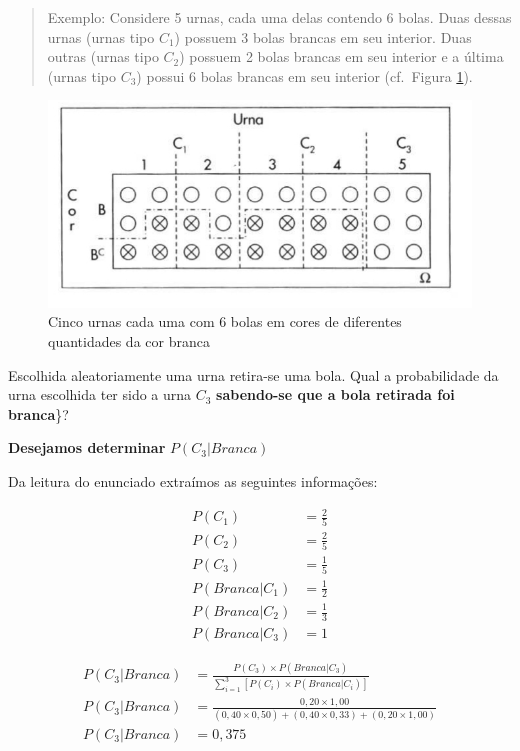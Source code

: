 \documentclass[
]{book}
\begin{document}
\begin{quote}
Exemplo: Considere 5 urnas, cada uma delas contendo 6 bolas. Duas dessas urnas (urnas tipo \(C_{1}\)) possuem 3 bolas brancas em seu interior. Duas outras (urnas tipo \(C_{2}\)) possuem 2 bolas brancas em seu interior e a última (urnas tipo \(C_{3}\)) possui 6 bolas brancas em seu interior (cf.~Figura \ref{fig:fig11}).
\end{quote}

\hfill\break

\begin{figure}

{\centering \includegraphics[width=0.5\linewidth]{images4/exemplo_02_bayes} 

}

\caption{Cinco urnas cada uma com 6 bolas em cores de diferentes quantidades da cor branca}\label{fig:fig11}
\end{figure}

\hfill\break

Escolhida aleatoriamente uma urna retira-se uma bola. Qual a probabilidade da urna escolhida ter sido a urna \(C_{3}\) \textbf{sabendo-se que a bola retirada foi branca}\}?

\hfill\break

\textbf{Desejamos determinar} \(P(C_{3} | Branca)\)

\hfill\break

Da leitura do enunciado extraímos as seguintes informações:

\hfill\break

\begin{align*}
P(C_{1}) & = \frac{2}{5} \\
P(C_{2}) & = \frac{2}{5} \\
P(C_{3}) & = \frac{1}{5} \\
P(Branca | C_{1}) & = \frac{1}{2} \\
P(Branca | C_{2}) & = \frac{1}{3} \\
P(Branca | C_{3}) & = 1
\end{align*}

\hfill\break

\begin{align*}
P(C_{3} | Branca) & = \frac{ P(C_{3}) \times P(Branca | C_{3})  }{  \sum _{i=1}^{3}\left[P\left({C}_{i}\right)\times P\left(Branca | {C}_{i}\right)\right]  } \\
P(C_{3} | Branca) & = \frac{ 0,20 \times 1,00} { (0,40  \times 0,50 ) + (0,40 \times 0,33 ) +(0,20 \times 1,00)} \\
P(C_{3} | Branca) & = 0,375
\end{align*}
\end{document}
